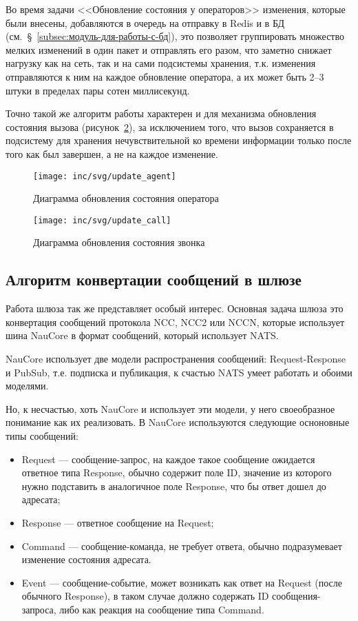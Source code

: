 Во время задачи <<Обновление состояния у операторов>>
изменения, которые были внесены, добавляются в очередь на отправку в Redis и в БД (см.~\S~\ref{subsec:модуль-для-работы-с-бд}),
это позволяет группировать множество мелких изменений в один пакет и отправлять его разом,
что заметно снижает нагрузку как на сеть, так и на сами подсистемы хранения,
т.к. изменения отправляются к ним на каждое обновление оператора, а их может быть 2--3 штуки в пределах пары сотен миллисекунд.

Точно такой же алгоритм работы характерен и для механизма обновления состояния вызова (рисунок~\ref{pic:call:activity-update}),
за исключением того,
что вызов сохраняется в подсистему для хранения нечувствительной ко времени информации только после того как был завершен,
а не на каждое изменение.

\begin{figure}[!ht]
    \centering
    \texttt{[image: inc/svg/update\_agent]}
    \caption{Диаграмма обновления состояния оператора}
    \label{pic:agent:activity-update}
\end{figure}

\begin{figure}[!ht]
    \centering
    \texttt{[image: inc/svg/update\_call]}
    \caption{Диаграмма обновления состояния звонка}
    \label{pic:call:activity-update}
\end{figure}

\subsection{Алгоритм конвертации сообщений в шлюзе}\label{subsec:алгоритм-конвертации-сообщений-в-шлюзе}

Работа шлюза так же представляет особый интерес.
Основная задача шлюза это конвертация сообщений протокола NCC, NCC2 или NCCN,
которые использует шина NauCore в формат сообщений, который использует NATS\@.

NauCore использует две модели распространения сообщений: Request-Response и PubSub,
т.е. подписка и публикация, к счастью NATS умеет работать и обоими моделями.

Но, к несчастью, хоть NauCore и использует эти модели, у него своеобразное понимание как их реализовать.
В NauCore используются следующие осноновные типы сообщений:
\begin{itemize}
    \item Request --- сообщение-запрос, на каждое такое сообщение ожидается ответное типа Response,
    обычно содержит поле ID, значение из которого нужно подставить в аналогичное поле Response, что бы ответ дошел до адресата;
    \item Response --- ответное сообщение на Request;
    \item Command --- сообщение-команда, не требует ответа, обычно подразумевает изменение состояния адресата.
    \item Event --- сообщение-событие, может возникать как ответ на Request (после обычного Response),
    в таком случае должно содержать ID сообщения-запроса, либо как реакция на сообщение типа Command.
\end{itemize}

